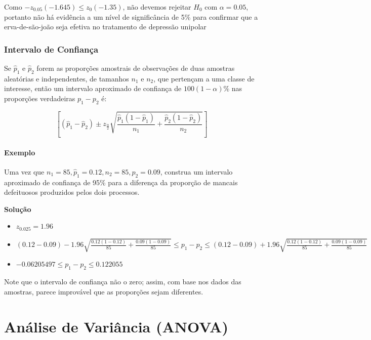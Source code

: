 \documentclass[
]{book}
\providecommand{\tightlist}{%
  \setlength{\itemsep}{0pt}\setlength{\parskip}{0pt}}
\begin{document}
Como \(-z_{0.05}(-1.645)\leq z_0 (-1.35)\), não devemos rejeitar \(H_0\) com \(\alpha=0.05\), portanto não há evidência a um nível de significância de 5\% para confirmar que a erva-de-são-joão seja efetiva no tratamento de depressão unipolar

\hypertarget{intervalo-de-confianuxe7a-3}{%
\subsection{Intervalo de Confiança}\label{intervalo-de-confianuxe7a-3}}

Se \(\hat p_1\) e \(\hat p_2\) forem as proporções amostrais de observações de duas amostras aleatórias e independentes, de tamanhos \(n_1\) e \(n_2\), que pertençam a uma classe de interesse, então um intervalo aproximado de confiança de \(100(1-\alpha)\%\) nas proporções verdadeiras \(p_1-p_2\) é:

\[\left[(\hat p_1-\hat p_2) \pm z_{\frac{\alpha}{2}}\sqrt{\frac{\hat p_1(1-\hat p_1)}{n_1}+\frac{\hat p_2(1-\hat p_2)}{n_2}}\right]\]

\hypertarget{exemplo-18}{%
\subsubsection{Exemplo}\label{exemplo-18}}

Uma vez que \(n_1=85,\hat p_1=0.12,n_2=85, \hat p_2=0.09\), construa um intervalo aproximado de confiança de 95\% para a diferença da proporção de mancais defeituosos produzidos pelos dois processos.

\textbf{Solução}

\begin{itemize}
\tightlist
\item
  \(z_{0.025}=1.96\)
\item
  \((0.12-0.09) - 1.96\sqrt{\frac{0.12(1-0.12)}{85}+\frac{0.09(1-0.09)}{85}}\leq p_1-p_2 \leq (0.12-0.09) + 1.96\sqrt{\frac{0.12(1-0.12)}{85}+\frac{0.09(1-0.09)}{85}}\)
\item
  \(-0.06205497 \leq p_1-p_2 \leq 0.122055\)
\end{itemize}

Note que o intervalo de confiança não o zero; assim, com base nos dados das amostras, parece improvável que as proporções sejam diferentes.

\hypertarget{anuxe1lise-de-variuxe2ncia-anova}{%
\chapter{Análise de Variância (ANOVA)}\label{anuxe1lise-de-variuxe2ncia-anova}}
\end{document}
